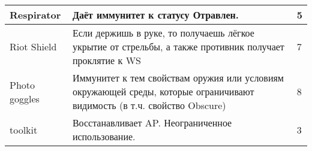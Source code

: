 \begin{table}[h]
\begin{tabularx}{\textwidth}{|l|X|l|}
    Respirator     & Даёт иммунитет к статусу Отравлен.                                                                                       & 5   \\ \hline
    Riot Shield    & Если держишь в руке, то получаешь лёгкое укрытие от стрельбы, а также противник получает проклятие к WS                  & 7   \\ \hline
    Photo goggles  & Иммунитет к тем свойствам оружия или условиям окружающей среды, которые ограничивают видимость (в т.ч. свойство Obscure) & 8   \\ \hline
    toolkit        & Восстанавливает AP. Неограниченное использование.                                                                        & 3   \\ \hline
    \end{tabularx}
    \end{table}